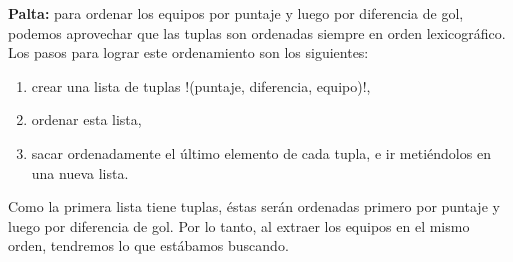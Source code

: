 \documentclass[12pt,spanish]{article}
\begin{document}
\begin{enumerate}[leftmargin=0pt]
      \textbf{Palta:}
      para ordenar los equipos por puntaje y luego por diferencia de gol,
      podemos aprovechar que las tuplas son ordenadas siempre
      en orden lexicográfico.
      Los pasos para lograr este ordenamiento son los siguientes:
      \begin{enumerate}
        \item
          crear una lista de tuplas \li!(puntaje, diferencia, equipo)!,
        \item
          ordenar esta lista,
        \item
          sacar ordenadamente el último elemento de cada tupla,
          e ir metiéndolos en una nueva lista.
      \end{enumerate}
      Como la primera lista tiene tuplas,
      éstas serán ordenadas primero por puntaje
      y luego por diferencia de gol.
      Por lo tanto,
      al extraer los equipos en el mismo orden,
      tendremos lo que estábamos buscando.
  \end{enumerate}
\end{document}
